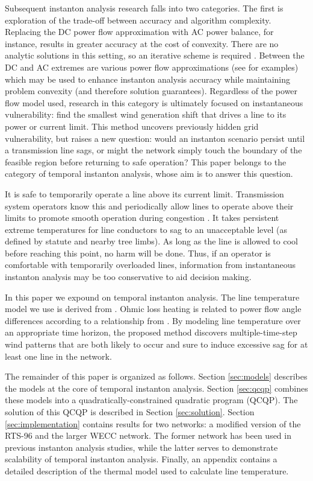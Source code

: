 \documentclass[journal,twoside]{IEEEtran}
\begin{document}
Subsequent instanton analysis research falls into two categories. The first is exploration of the trade-off between accuracy and algorithm complexity. Replacing the DC power flow approximation with AC power balance, for instance, results in greater accuracy at the cost of convexity. There are no analytic solutions in this setting, so an iterative scheme is required \cite{baghsorkhi2012}. Between the DC and AC extremes are various power flow approximations (see \cite{coffrin2012,hijazi2013,coffrin2014} for examples) which may be used to enhance instanton analysis accuracy while maintaining problem convexity (and therefore solution guarantees). Regardless of the power flow model used, research in this category is ultimately focused on instantaneous vulnerability: find the smallest wind generation shift that drives a line to its power or current limit. This method uncovers previously hidden grid vulnerability, but raises a new question: would an instanton scenario persist until a transmission line sags, or might the network simply touch the boundary of the feasible region before returning to safe operation? This paper belongs to the category of temporal instanton analysis, whose aim is to answer this question.

It is safe to temporarily operate a line above its current limit. Transmission system operators know this and periodically allow lines to operate above their limits to promote smooth operation during congestion \cite{banakar2005}. It takes persistent extreme temperatures for line conductors to sag to an unacceptable level (as defined by statute and nearby tree limbs). As long as the line is allowed to cool before reaching this point, no harm will be done. Thus, if an operator is comfortable with temporarily overloaded lines, information from instantaneous instanton analysis may be too conservative to aid decision making.

In this paper we expound on temporal instanton analysis. The line temperature model we use is derived from \cite{ieee2013}. Ohmic loss heating is related to power flow angle differences according to a relationship from \cite{almassalkhi2014}. By modeling line temperature over an appropriate time horizon, the proposed method discovers multiple-time-step wind patterns that are both likely to occur and sure to induce excessive sag for at least one line in the network.

The remainder of this paper is organized as follows. Section \ref{sec:models} describes the models at the core of temporal instanton analysis. Section \ref{sec:qcqp} combines these models into a quadratically-constrained quadratic program (QCQP). The solution of this QCQP is described in Section \ref{sec:solution}. Section \ref{sec:implementation}  contains results for two networks: a modified version of the RTS-96 and the larger WECC network. The former network has been used in previous instanton analysis studies, while the latter serves to demonstrate scalability of temporal instanton analysis. Finally, an appendix contains a detailed description of the thermal model used to calculate line temperature.
\end{document}
